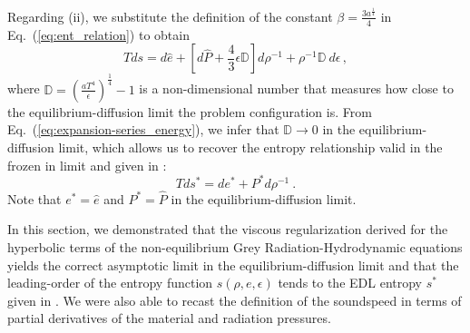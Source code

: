 \documentclass[review]{elsarticle}
\newcommand{\eqt}[1]{Eq.~(\ref{#1})}                     %
\begin{document}
Regarding (ii), we substitute the definition of the constant $\beta = \frac{3a^\frac{1}{4}}{4}$ in \eqt{eq:ent_relation} to obtain
%
\begin{equation}\label{eq:ent_relation2}
Tds = d\hat{e} + \left[ d\hat{P} + \frac{4}{3}\epsilon \mathbb{D} \right] d \rho^{-1} + \rho^{-1}\mathbb{D} \ d \epsilon \,,
\end{equation}
%
where $\mathbb{D} = \left(\frac{aT^4}{\epsilon}\right)^\frac{1}{4}-1$ is a non-dimensional number that measures how close to the equilibrium-diffusion limit the problem configuration is. From \eqt{eq:expansion-series_energy}, we infer that $\mathbb{D} \to 0$ in the equilibrium-diffusion limit, which allows us to recover the entropy relationship valid in the frozen in limit and given in \cite{LowrieMorel}:
%
\begin{equation}
Tds^* = de^* + P^*d \rho^{-1} \ .
\end{equation}
%
Note that $e^* = \hat{e}$ and $P^* = \hat{P}$ in the equilibrium-diffusion limit.
 
In this section, we demonstrated that the viscous regularization derived for the hyperbolic terms of the non-equilibrium Grey Radiation-Hydrodynamic equations yields the correct asymptotic limit in the equilibrium-diffusion limit and that the leading-order  of the entropy function $s(\rho, e, \epsilon)$ tends to the EDL entropy $s^*$ given in \cite{LowrieMorel}. We were also able to recast the definition of the soundspeed in terms of partial derivatives of the material and radiation pressures.
%
\end{document}
